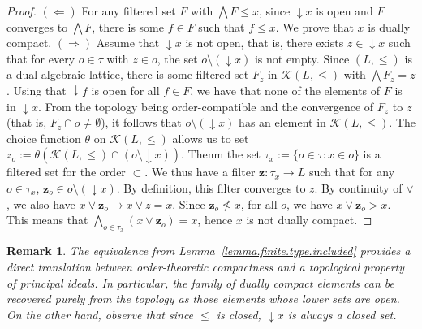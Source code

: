 \documentclass{article}
\newtheorem{lemma}[theorem]{Lemma}
\newtheorem{remark}[theorem]{Remark}
\begin{document}
\begin{proof}
   $(\Leftarrow)$ 
   {For any filtered set $F$ with $\bigwedge F \le x$, since $\mathop{\downarrow}x$ is open and $F$ converges to $\bigwedge F$, there is some $f \in F$ such that $f \le x$. We prove that $x$ is dually compact.} $(\Rightarrow)$ {Assume that $\mathop{\downarrow}x$ is not open, that is, there exists $z \in \mathop{\downarrow}x$ such that for every $o \in \tau$ with $z \in o$, the set $o \setminus (\mathop{\downarrow}x)$ is not empty. Since $(L,\le)$ is a dual algebraic lattice, there is some filtered set $F_z$ in $\mathcal{K}(L,\le)$ with $\bigwedge F_z = z$. %
Using that  $\mathop{\downarrow}f$ is open for all \(f\in F\), we have that none of the elements of $F$ is in $\mathop{\downarrow}x$. From the topology being order-compatible and the convergence of $F_z$ to $z$ (that is, $F_z \cap o \neq \emptyset$), it follows that $o \setminus (\mathop{\downarrow}x)$ has an element in $\mathcal{K}(L,\le)$. The choice function \(\theta\) on $\mathcal{K}(L,\le)$ allows us to set $z_o := \theta(\mathcal{K}(L,\le) \cap(o\setminus \mathop{\downarrow}x ))$. Thenm the set $\tau_x := \{o \in \tau: x \in o\}$ is a filtered set for the order $\subset$. We thus have a filter $\boldsymbol{z} : \tau_x \rightarrow L$ such that for any $o \in \tau_x$, $\boldsymbol{z}_o \in o \setminus (\mathop{\downarrow}x)$. 
    By definition, this filter converges to $z$. By continuity of $\vee$, we also have $x \vee \boldsymbol{z}_o \rightarrow x \vee z = x$. Since $\boldsymbol{z}_o \not \le x$, for all $o$, we have $x \vee \boldsymbol{z}_o > x$. This means that $\bigwedge_{o \in \tau_x} (x \vee \boldsymbol{z}_o) = x$, hence $x$ is not dually compact.}
\end{proof}

\begin{remark}
The equivalence from Lemma~\ref{lemma.finite.type.included} provides a direct translation between order-theoretic compactness and a topological property of principal ideals. In particular, the family of dually compact elements can be recovered purely from the topology as those elements whose lower sets are open. On the other hand, observe that since $\le$ is closed, $\mathop{\downarrow}x$ is always a closed set.
\end{remark}

\end{document}
